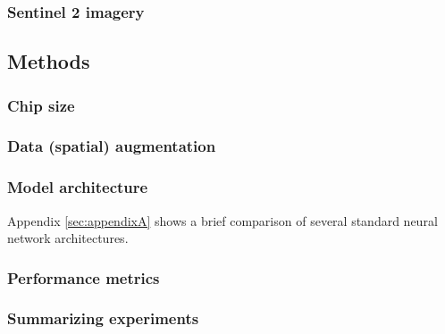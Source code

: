 



\subsubsection{Sentinel 2 imagery}


\subsection{Methods}


\subsubsection{Chip size}


\subsubsection{Data (spatial) augmentation}



\subsubsection{Model architecture}



Appendix \ref*{sec:appendixA} shows a brief comparison of several standard neural network architectures.





\subsubsection{Performance metrics}




\subsubsection{Summarizing experiments}


